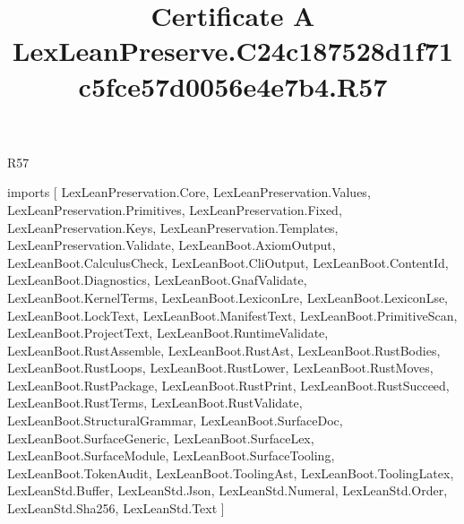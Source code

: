 \begin{lexlean}{R57}
\title{Certificate A LexLeanPreserve.C24c187528d1f71c5fce57d0056e4e7b4.R57}
\begin{coremodule}
imports [
  LexLeanPreservation.Core,
  LexLeanPreservation.Values,
  LexLeanPreservation.Primitives,
  LexLeanPreservation.Fixed,
  LexLeanPreservation.Keys,
  LexLeanPreservation.Templates,
  LexLeanPreservation.Validate,
  LexLeanBoot.AxiomOutput,
  LexLeanBoot.CalculusCheck,
  LexLeanBoot.CliOutput,
  LexLeanBoot.ContentId,
  LexLeanBoot.Diagnostics,
  LexLeanBoot.GnafValidate,
  LexLeanBoot.KernelTerms,
  LexLeanBoot.LexiconLre,
  LexLeanBoot.LexiconLse,
  LexLeanBoot.LockText,
  LexLeanBoot.ManifestText,
  LexLeanBoot.PrimitiveScan,
  LexLeanBoot.ProjectText,
  LexLeanBoot.RuntimeValidate,
  LexLeanBoot.RustAssemble,
  LexLeanBoot.RustAst,
  LexLeanBoot.RustBodies,
  LexLeanBoot.RustLoops,
  LexLeanBoot.RustLower,
  LexLeanBoot.RustMoves,
  LexLeanBoot.RustPackage,
  LexLeanBoot.RustPrint,
  LexLeanBoot.RustSucceed,
  LexLeanBoot.RustTerms,
  LexLeanBoot.RustValidate,
  LexLeanBoot.StructuralGrammar,
  LexLeanBoot.SurfaceDoc,
  LexLeanBoot.SurfaceGeneric,
  LexLeanBoot.SurfaceLex,
  LexLeanBoot.SurfaceModule,
  LexLeanBoot.SurfaceTooling,
  LexLeanBoot.TokenAudit,
  LexLeanBoot.ToolingAst,
  LexLeanBoot.ToolingLatex,
  LexLeanStd.Buffer,
  LexLeanStd.Json,
  LexLeanStd.Numeral,
  LexLeanStd.Order,
  LexLeanStd.Sha256,
  LexLeanStd.Text
]


\end{coremodule}
\end{lexlean}
